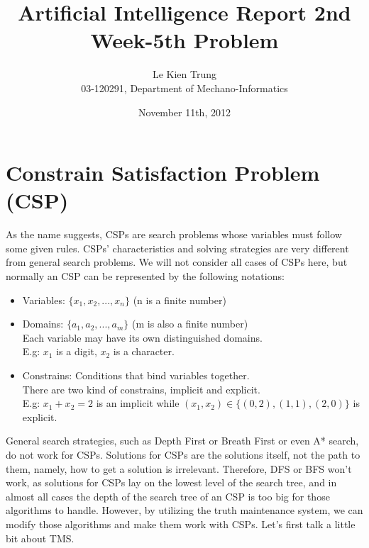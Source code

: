\documentclass[a4paper, 11pt]{article}
\title{Artificial Intelligence Report 2nd Week-5th Problem}
\author{Le Kien Trung \\
  03-120291, Department of Mechano-Informatics }
\date{November 11th, 2012}
\begin{document}
\maketitle
\section{Constrain Satisfaction  Problem (CSP)}
As the name suggests, CSPs are search problems whose variables must follow some given rules. CSPs' characteristics and solving strategies are very different from general search problems. We will not consider all cases of CSPs here, but normally an CSP can be represented by the following notations:
\begin{itemize}
\item Variables: $\{x_1, x_2, ..., x_n\}$ (n is a finite number)
\item Domains: $\{a_1, a_2, ..., a_m \}$ (m is also a finite number)\\
  Each variable may have its own distinguished domains. \\ E.g: $x_1$ is a digit, $x_2$ is a character. 
\item Constrains: Conditions that bind variables together. \\
  There are two kind of constrains, implicit and explicit.\\
  E.g: $x_1+x_2 = 2$ is an implicit while $(x_1, x_2) \in \{(0,2), (1,1), (2,0)\}$ is explicit.  
\end{itemize}
General search strategies, such as Depth First or Breath First or even A* search, do not work for CSPs. Solutions for CSPs are the solutions itself, not the path to them, namely, how to get a solution is irrelevant. Therefore, DFS or BFS won't work, as solutions for CSPs lay on the lowest level of the search tree, and in almost all cases the depth of the search tree of an CSP is too big for those algorithms to handle. However, by utilizing the truth maintenance system, we can modify those algorithms and make them work with CSPs. Let's first talk a little bit about TMS. 
\end{document}
